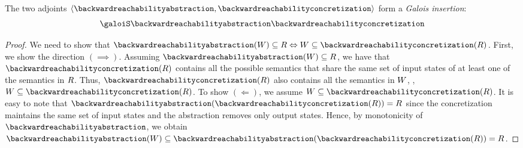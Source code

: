 \begin{theorem}
The two adjoints $\tuple{\backwardreachabilityabstraction}{\backwardreachabilityconcretization}$ form a \emph{Galois insertion}:
\begin{align*}
  \galoisinjbetweensemantics{collecting}{backwardreachability}
\end{align*}
\end{theorem}
\begin{proof}
  We need to show that $\backwardreachabilityabstraction(\defsetofsetofdependencies)\subseteq \defsetofsetofstates \iff \defsetofsetofdependencies\subseteq\backwardreachabilityconcretization(\defsetofsetofstates)$.
  First, we show the direction $(\implies)$.
  Assuming $\backwardreachabilityabstraction(\defsetofsetofdependencies)\subseteq \defsetofsetofstates$, we have that $\backwardreachabilityconcretization(\defsetofsetofstates)$ contains all the possible semantics that share the same set of input states of at least one of the semantics in $R$. Thus, $\backwardreachabilityconcretization(\defsetofsetofstates)$ also contains all the semantics in $W$, \ie, $\defsetofsetofdependencies\subseteq\backwardreachabilityconcretization(\defsetofsetofstates)$.
  To show $(\Leftarrow)$, we assume $\defsetofsetofdependencies\subseteq\backwardreachabilityconcretization(\defsetofsetofstates)$.
  It is easy to note that $\backwardreachabilityabstraction(\backwardreachabilityconcretization(\defsetofsetofstates)) = \defsetofsetofstates$ since the concretization maintains the same set of input states and the abstraction removes only output states.
  Hence, by monotonicity of $\backwardreachabilityabstraction$, we obtain $\backwardreachabilityabstraction(\defsetofsetofdependencies)\subseteq \backwardreachabilityabstraction(\backwardreachabilityconcretization(\defsetofsetofstates)) = \defsetofsetofstates$.
\end{proof}

